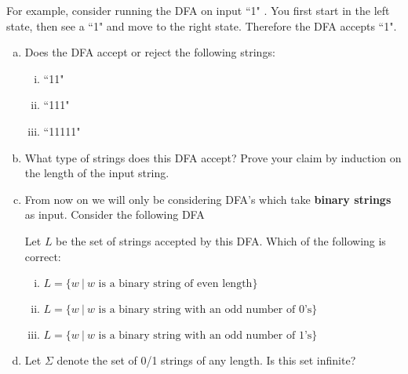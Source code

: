 \documentclass[12pt,letterpaper]{article}
\begin{document}
	For example, consider running the DFA on input ``1" . You first start in the left state, then see a ``1" and move to the right state. Therefore the DFA accepts ``1".
	\begin{enumerate}[a.]
	\item Does the DFA accept or reject the following strings:
	\begin{enumerate}[i.]
		\item ``11"
		\item ``111"
		\item ``11111"		
	\end{enumerate}
	\item What type of strings does this DFA accept? Prove your claim by induction on the length of the input string. 
	
	\begin{mdframed}
		\vspace{10cm}
	\end{mdframed}
	\item From now on we will only be considering DFA's which take \textbf{binary strings} as input. Consider the following DFA

	
	Let $L$ be the set of strings accepted by this DFA. Which of the following is correct:
	\begin{enumerate}[i.]
		\item $L = \{ w \ | \ w \text{ is a binary string of even length}\}$
		\item $L = \{ w \ | \ w \text{ is a binary string with an odd number of 0's}\}$
		\item $L = \{ w \ | \ w \text{ is a binary string with an odd number of 1's}\}$
	\end{enumerate}

	\item Let $\Sigma$ denote the set of 0/1 strings of any length. Is this set infinite?


\end{enumerate}
\end{document}
